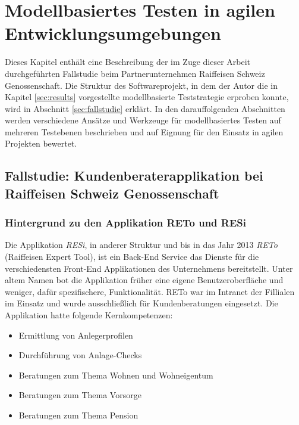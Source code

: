 \chapter{Modellbasiertes Testen in agilen Entwicklungsumgebungen}
\label{sec:problemdescription}

Dieses Kapitel enthält eine Beschreibung der im Zuge dieser Arbeit durchgeführten Fallstudie beim Partnerunternehmen Raiffeisen Schweiz Genossenschaft. Die Struktur des Softwareprojekt, in dem der Autor die in Kapitel \ref{sec:results}  vorgestellte modellbasierte Teststrategie erproben konnte, wird in Abschnitt \ref{sec:fallstudie} erklärt. In den darauffolgenden Abschnitten werden verschiedene Ansätze und Werkzeuge für modellbasiertes Testen auf mehreren Testebenen beschrieben und auf Eignung für den Einsatz in agilen Projekten bewertet.

\section{Fallstudie: Kundenberaterapplikation bei Raiffeisen Schweiz Genossenschaft}
\label{sec:fallstudie}
\subsection{Hintergrund zu den Applikation RETo und RESi}
Die Applikation \textit{RESi}, in anderer Struktur und bis in das Jahr 2013 \textit{RETo} (Raiffeisen Expert Tool), ist ein \Gls{Back-End} Service das Dienste für die verschiedensten \Gls{Front-End} Applikationen des Unternehmens bereitstellt. Unter altem Namen bot die Applikation früher eine eigene Benutzeroberfläche und weniger, dafür spezifischere, Funktionalität. RETo war im Intranet der Fillialen im Einsatz und wurde ausschließlich für Kundenberatungen eingesetzt. Die Applikation hatte folgende Kernkompetenzen:

\begin{itemize}
\item Ermittlung von Anlegerprofilen
\item Durchführung von Anlage-Checks
\item Beratungen zum Thema Wohnen und Wohneigentum
\item Beratungen zum Thema Vorsorge
\item Beratungen zum Thema Pension
\end{itemize}

